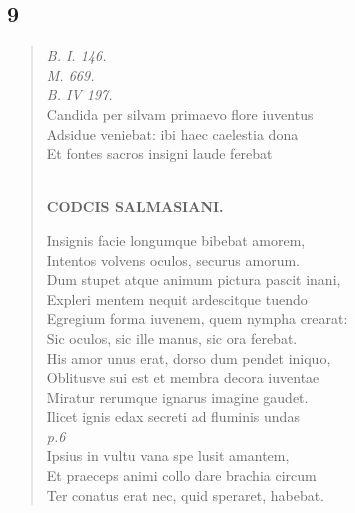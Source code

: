 \documentclass[11pt, a4paper]{report}
\begin{document}
            \subsection*{9}
      \begin{verse}
      \textit{B. I. 146.} \\ \textit{M. 669.} \\ \textit{B. IV 197.} \\ Candida per silvam primaevo flore iuventus \\ Adsidue veniebat: ibi haec caelestia dona \\ Et fontes sacros insigni laude ferebat \\ 
        ﻿\pagebreak 
    \begin{center} \textbf{CODCIS SALMASIANI.} \end{center} \marginpar{[39]} Insignis facie longumque bibebat amorem, \\ Intentos volvens oculos, securus amorum. \\ Dum stupet atque animum pictura pascit inani, \\ Expleri mentem nequit ardescitque tuendo \\ Egregium forma iuvenem, quem nympha crearat: \\ Sic oculos, sic ille manus, sic ora ferebat. \\ His amor unus erat, dorso dum pendet iniquo, \\ Oblitusve sui est et membra decora iuventae \\ Miratur rerumque ignarus imagine gaudet. \\ Ilicet ignis edax secreti ad fluminis undas \\ \textit{p.6} \\ Ipsius in vultu vana spe lusit amantem, \\ Et praeceps animi collo dare brachia circum \\ Ter conatus erat nec, quid speraret, habebat. \\ 
      \end{verse}
  
\end{document}
